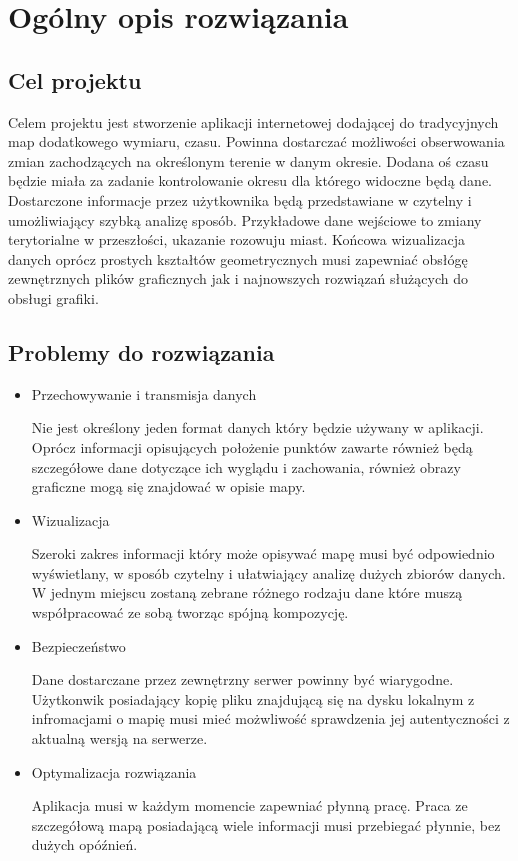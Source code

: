 \chapter{Ogólny opis rozwiązania}
\label{cha:opis}

\section{Cel projektu}
\label{sec:celProjektu}

Celem projektu jest stworzenie aplikacji internetowej dodającej do tradycyjnych map dodatkowego wymiaru, czasu. Powinna dostarczać możliwości obserwowania zmian zachodzących na określonym terenie w danym okresie. Dodana oś czasu będzie miała za zadanie kontrolowanie okresu dla którego widoczne będą dane. Dostarczone informacje przez użytkownika będą przedstawiane w czytelny i umożliwiający szybką analizę sposób. Przykładowe dane wejściowe to zmiany terytorialne w przeszłości, ukazanie rozowuju miast. Końcowa wizualizacja danych oprócz prostych kształtów geometrycznych musi zapewniać obsłógę zewnętrznych plików graficznych jak i najnowszych rozwiązań służących do obsługi grafiki.

\section{Problemy do rozwiązania}
\label{sec:problemy}

\begin{itemize}

\item
Przechowywanie i transmisja danych

Nie jest określony jeden format danych który będzie używany w aplikacji. Oprócz informacji opisujących położenie punktów zawarte również będą szczegółowe dane dotyczące ich wyglądu i zachowania, również obrazy graficzne mogą się znajdować w opisie mapy.

\item
Wizualizacja

Szeroki zakres informacji który może opisywać mapę musi być odpowiednio wyświetlany, w sposób czytelny i ułatwiający analizę dużych zbiorów danych. W jednym miejscu zostaną zebrane różnego rodzaju dane które muszą współpracować ze sobą tworząc spójną kompozycję.

\item
Bezpieczeństwo

Dane dostarczane przez zewnętrzny serwer powinny być wiarygodne. Użytkonwik posiadający kopię pliku znajdującą się na dysku lokalnym z infromacjami o mapię musi mieć możwliwość sprawdzenia jej autentyczności z aktualną wersją na serwerze.

\item
Optymalizacja rozwiązania

Aplikacja musi w każdym momencie zapewniać płynną pracę. Praca  ze szczegółową mapą posiadającą wiele informacji musi przebiegać płynnie, bez dużych opóźnień.

\end{itemize}

